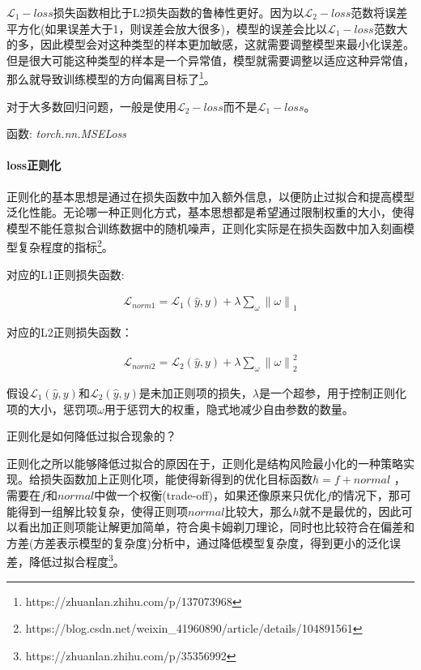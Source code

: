 \documentclass[letterpaper,12pt]{article}
\begin{document}
			$\mathcal{L}_1-loss$损失函数相比于L2损失函数的鲁棒性更好。因为以$\mathcal{L}_2-loss$范数将误差平方化(如果误差大于1，则误差会放大很多)，模型的误差会比以$\mathcal{L}_1-loss$范数大的多，因此模型会对这种类型的样本更加敏感，这就需要调整模型来最小化误差。但是很大可能这种类型的样本是一个异常值，模型就需要调整以适应这种异常值，那么就导致训练模型的方向偏离目标了\footnote{https://zhuanlan.zhihu.com/p/137073968}。
			
			对于大多数回归问题，一般是使用$\mathcal{L}_2-loss$而不是$\mathcal{L}_1-loss$。
			
			函数: \textit{torch.nn.MSELoss}
			
			\paragraph{loss正则化}
			
			正则化的基本思想是通过在损失函数中加入额外信息，以便防止过拟合和提高模型泛化性能。无论哪一种正则化方式，基本思想都是希望通过限制权重的大小，使得模型不能任意拟合训练数据中的随机噪声，正则化实际是在损失函数中加入刻画模型复杂程度的指标\footnote{https://blog.csdn.net/weixin\_41960890/article/details/104891561}。
			
			对应的L1正则损失函数:
			
			\begin{equation}
				\begin{aligned}
					\mathcal{L}_{norm1} = \mathcal{L}_{1}{\left(\hat{y},y\right)} + \lambda \sum_{\omega}{\| \omega \|}_1
				\end{aligned}
			\end{equation}
			
			对应的L2正则损失函数：
			
			\begin{equation}
				\begin{aligned}
					\mathcal{L}_{norm2} = \mathcal{L}_{2}{\left(\hat{y},y\right)} + \lambda \sum_{\omega}{\| \omega \|}^2_2
				\end{aligned}
			\end{equation}
			
			假设$\mathcal{L}_{1}{\left(\hat{y},y\right)}$和$\mathcal{L}_{2}{\left(\hat{y},y\right)}$是未加正则项的损失，$\lambda$是一个超参，用于控制正则化项的大小，惩罚项$\omega$用于惩罚大的权重，隐式地减少自由参数的数量。
			
			正则化是如何降低过拟合现象的？
			
			正则化之所以能够降低过拟合的原因在于，正则化是结构风险最小化的一种策略实现。给损失函数加上正则化项，能使得新得到的优化目标函数$h = f + normal$ ，需要在$f$和$normal$中做一个权衡(trade-off)，如果还像原来只优化$f$的情况下，那可能得到一组解比较复杂，使得正则项$normal$比较大，那么$h$就不是最优的，因此可以看出加正则项能让解更加简单，符合奥卡姆剃刀理论，同时也比较符合在偏差和方差(方差表示模型的复杂度)分析中，通过降低模型复杂度，得到更小的泛化误差，降低过拟合程度\footnote{https://zhuanlan.zhihu.com/p/35356992}。
			
\end{document}
